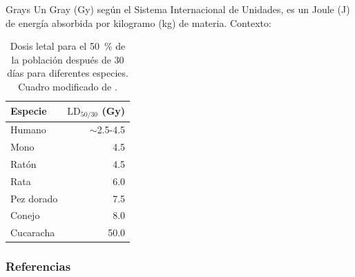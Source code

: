 \documentclass{beamer}
\begin{document}
\appendix
\begin{frame}{Grays}
\label{backup:grays}
Un Gray (\si{\gray}) según el Sistema Internacional de Unidades, es un Joule (\si{\joule}) de energía absorbida por kilogramo (\si{\kilogram}) de materia.
Contexto:
\begin{table}[]
  \centering
  \begin{tabular}{lr}
  \toprule
  Especie & $\mathrm{LD}_{50/30}$ (\si{\gray})\\
  \midrule
  Humano & $\sim$2.5-4.5 \\
  Mono & 4.5 \\
  Ratón & 4.5 \\
  Rata & 6.0 \\
  Pez dorado & 7.5 \\
  Conejo & 8.0 \\
  Cucaracha & 50.0 \\
  \bottomrule
	\end{tabular}%
	\caption{Dosis letal para el \SI{50}{\percent} de la población después de 30 días para diferentes especies. Cuadro modificado de \cite{Bolus2017}. \hyperlink{teng}{}} 
	\label{tab:LD5030}
\end{table}
\end{frame}
\begin{frame}[allowframebreaks]
\frametitle{Referencias}
	\printbibliography
\end{frame}
\end{document}
